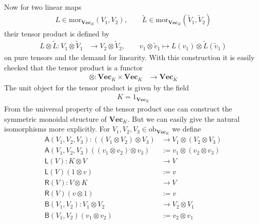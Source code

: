\\
Now for two linear maps
\begin{align*}
  L
  \in
  \mathrm{mor}_{\mathbf{Vec}_{K}}
  \left(
    V_{1}
    ,
    V_{2}
  \right)
  ,\qquad
  \tilde{L}
  \in
  \mathrm{mor}_{\mathbf{Vec}_{K}}
  \left(
    \tilde{V}_{1}
    ,
    \tilde{V}_{2}
  \right)
\end{align*}
their tensor product is defined by
\begin{align*}
  L
  \otimes
  \tilde{L}
  \colon
  V_{1}
  \otimes
  \tilde{V}_{1}
  &\to
  V_{2}
  \otimes
  \tilde{V}_{2}
  ,\qquad
  v_{1}
  \otimes
  \tilde{v}_{1}
  \mapsto
  L(v_{1})
  \otimes
  \tilde{L}(\tilde{v}_{1})
\end{align*}
on pure tensors and the demand for linearity. With this construction it is easily checked that the tensor product is a functor
\begin{align*}
  \otimes
  \colon
  \mathbf{Vec}_{K}
  \times
  \mathbf{Vec}_{K}
  &\to
  \mathbf{Vec}_{K}
\end{align*}
The unit object for the tensor product is given by the field
\begin{align*}
  K = 1_{\mathbf{Vec}_{K}}
\end{align*}
From the universal property of the tensor product one can construct the symmetric monoidal structure of $\mathbf{Vec}_{K}$. But we can easily give the natural isomorphisms more explicitly. For $V_{1},V_{2},V_{3} \in \mathrm{ob}_{\mathbf{Vec}_{K}}$ we define
\begin{align*}
  \mathsf{A}(V_{1},V_{2},V_{3})
  \colon
  \left(
    (V_{1} \otimes V_{2})
    \otimes
    V_{3}
  \right)
  &\to
  V_{1}
  \otimes
  (V_{2} \otimes V_{3})
  \\
  \mathsf{A}(V_{1},V_{2},V_{3})
  \left(
    (v_{1} \otimes v_{2})
    \otimes
    v_{3}
  \right)
  &:=
  v_{1}
  \otimes
  (v_{2} \otimes v_{3})
  \\
  \mathsf{L}(V)
  \colon
  K
  \otimes
  V
  &\to
  V
  \\
  \mathsf{L}(V)(1 \otimes v)
  &:=
  v
  \\
  \mathsf{R}(V)
  \colon
  V
  \otimes
  K
  &\to
  V
  \\
  \mathsf{R}(V)(v \otimes 1)
  &:=
  v
  \\
  \mathsf{B}(V_{1},V_{2})
  \colon
  V_{1}
  \otimes
  V_{2}
  &\to
  V_{2}
  \otimes
  V_{1}
  \\
  \mathsf{B}(V_{1},V_{2})(v_{1} \otimes v_{2})
  &:=
  v_{2}
  \otimes
  v_{1}
\end{align*}
